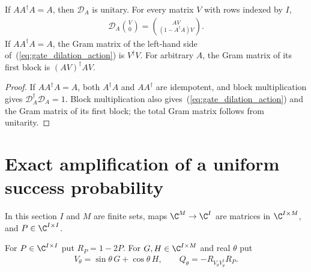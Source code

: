 \begin{theorem}
    \label{thm:gate_partial_isometry_dilation}
    \leanok
    If $AA^\dagger A=A$, then $\mathcal D_A$ is unitary. For every matrix $V$
    with rows indexed by $I$,
    \begin{align}
        \mathcal D_A\binom V0=\binom{AV}{(1-A^\dagger A)V}.
        \label{eq:gate_dilation_action}
    \end{align}
    If $AA^\dagger A=A$, the Gram matrix of the left-hand side
    of~(\ref{eq:gate_dilation_action}) is $V^\dagger V$. For arbitrary $A$,
    the Gram matrix of its first block is $(AV)^\dagger AV$.
\end{theorem}
\begin{proof}\leanok
    If $AA^\dagger A=A$, both $A^\dagger A$ and $AA^\dagger$ are idempotent,
    and block multiplication gives $\mathcal D_A^\dagger\mathcal D_A=1$.
    Block multiplication also gives~(\ref{eq:gate_dilation_action}) and the
    Gram matrix of its first block; the total Gram matrix follows from
    unitarity.
\end{proof}

\section{Exact amplification of a uniform success probability}
\label{sec:gate_amplification}

In this section $I$ and $M$ are finite sets, maps $\C^M\to\C^I$ are matrices
in $\C^{I\times M}$, and $P\in\C^{I\times I}$.

\begin{definition}
    \label{def:gate_subspace_amplification}
    \leanok
    For $P\in\C^{I\times I}$ put $R_P=1-2P$. For $G,H\in\C^{I\times M}$ and
    real $\theta$ put
    \begin{align}
        V_\theta=\sin\theta\,G+\cos\theta\,H,
        \qquad Q_\theta=-R_{V_\theta V_\theta^\dagger}R_P.
    \end{align}
\end{definition}

